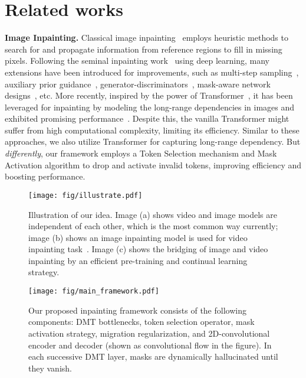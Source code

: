 \documentclass[10pt,twocolumn,letterpaper]{article}
\begin{document}
\section{Related works}
\noindent
\textbf{Image Inpainting.} Classical image inpainting~\cite{barnes09patchmatch} employs heuristic methods to search for and propagate information from reference regions to fill in missing pixels. Following the seminal inpainting work~\cite{pathak16ce} using deep learning, many extensions have been introduced for improvements, such as multi-step sampling~\cite{song21scoresde,yu2023magic}, auxiliary prior guidance~\cite{yu22mmt,yu2023magic}, generator-discriminators~\cite{jain22fcf,yu22invertfill}, mask-aware network designs~\cite{Iizuka17global,Liu18partial,yu19free,yu20reigon}, etc. More recently, inspired by the power of Transformer~\cite{vaswani2017attention,Dosovitskiy21ViT}, it has been leveraged for inpainting by modeling the long-range dependencies in images and exhibited promising performance~\cite{li22mat,yu22mmt,zeng20sttn}. Despite this, the vanilla Transformer might suffer from high computational complexity, limiting its efficiency. Similar to these approaches, we also utilize Transformer for capturing long-range dependency. But \emph{differently}, our framework employs a Token Selection mechanism and Mask Activation algorithm to drop and activate invalid tokens, improving efficiency and boosting performance. 

\begin{figure}[!t]
\centering
\texttt{[image: fig/illustrate.pdf]}
\caption{Illustration of our idea. Image (a) shows video and image models are independent of each other, which is the most common way currently; image (b) shows an image inpainting model is used for video inpainting task~\cite{xu19dfc}. Image (c) shows the bridging of image and video inpainting by an efficient pre-training and continual learning strategy.}
\label{fig:rela}
\vspace{-2mm}
\end{figure}

\begin{figure*}[t]
  \centering
  \texttt{[image: fig/main\_framework.pdf]}
  \caption{Our proposed inpainting framework consists of the following components: DMT bottlenecks, token selection operator, mask activation strategy, migration regularization, and 2D-convolutional encoder and decoder (shown as convolutional flow in the figure). In each successive DMT layer, masks are dynamically hallucinated until they vanish. }\label{fig:pipeline}
  \vspace{-3mm}
\end{figure*}
\end{document}
